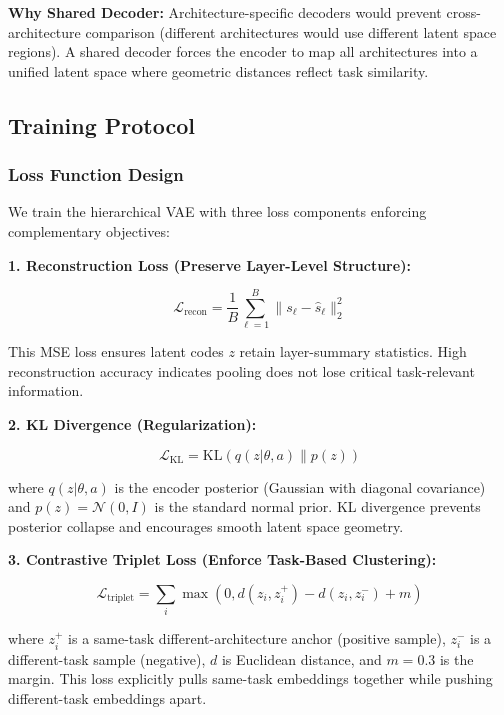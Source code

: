 \textbf{Why Shared Decoder:} Architecture-specific decoders would prevent cross-architecture comparison (different architectures would use different latent space regions). A shared decoder forces the encoder to map all architectures into a unified latent space where geometric distances reflect task similarity.

\subsection{Training Protocol}

\subsubsection{Loss Function Design}

We train the hierarchical VAE with three loss components enforcing complementary objectives:

\textbf{1. Reconstruction Loss (Preserve Layer-Level Structure):}

\begin{equation}
\mathcal{L}_{\text{recon}} = \frac{1}{B} \sum_{\ell=1}^B \| s_\ell - \hat{s}_\ell \|_2^2
\end{equation}

This MSE loss ensures latent codes $z$ retain layer-summary statistics. High reconstruction accuracy indicates pooling does not lose critical task-relevant information.

\textbf{2. KL Divergence (Regularization):}

\begin{equation}
\mathcal{L}_{\text{KL}} = \text{KL}\left( q(z | \theta, a) \| p(z) \right)
\end{equation}

where $q(z | \theta, a)$ is the encoder posterior (Gaussian with diagonal covariance) and $p(z) = \mathcal{N}(0, I)$ is the standard normal prior. KL divergence prevents posterior collapse and encourages smooth latent space geometry.

\textbf{3. Contrastive Triplet Loss (Enforce Task-Based Clustering):}

\begin{equation}
\mathcal{L}_{\text{triplet}} = \sum_{i} \max(0, d(z_i, z_i^+) - d(z_i, z_i^-) + m)
\end{equation}

where $z_i^+$ is a same-task different-architecture anchor (positive sample), $z_i^-$ is a different-task sample (negative), $d$ is Euclidean distance, and $m=0.3$ is the margin. This loss explicitly pulls same-task embeddings together while pushing different-task embeddings apart.

